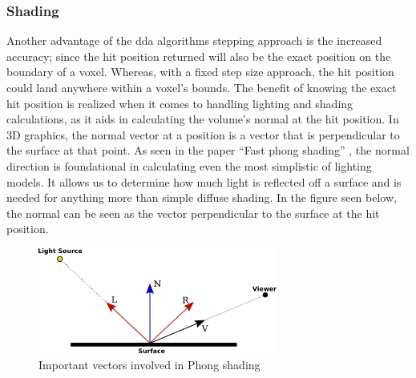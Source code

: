\documentclass[titlepage]{article}
\begin{document}
\subsubsection{Shading}
Another advantage of the \gls{dda} algorithms stepping approach is the increased accuracy; since the hit position returned will also be the exact position on the boundary of a voxel. Whereas, with a fixed step size approach, the hit position could land anywhere within a voxel's bounds. The benefit of knowing the exact hit position is realized when it comes to handling lighting and shading calculations, as it aids in calculating the volume's normal at the hit position. In 3D graphics, the normal vector at a position is a vector that is perpendicular to the surface at that point. As seen in the paper ``Fast phong shading'' \cite{phong}, the normal direction is foundational in calculating even the most simplistic of lighting models. It allows us to determine how much light is reflected off a surface and is needed for anything more than simple diffuse shading. In the figure seen below, the normal can be seen as the vector perpendicular to the surface at the hit position.

\begin{figure}[htp]
  \centering
  \includegraphics[width=0.7\textwidth]{phong.png}
  \caption{Important vectors involved in Phong shading}
\end{figure}
\FloatBarrier
\end{document}

